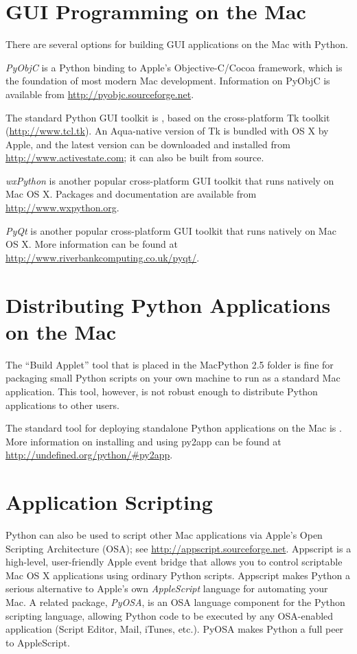 \section{GUI Programming on the Mac}

There are several options for building GUI applications on the Mac with Python.

\emph{PyObjC} is a Python binding to Apple's Objective-C/Cocoa framework, which
is the foundation of most modern Mac development. Information on PyObjC is
available from \url{http://pyobjc.sourceforge.net}.

The standard Python GUI toolkit is , based on the cross-platform
Tk toolkit (\url{http://www.tcl.tk}). An Aqua-native version of Tk is bundled
with OS X by Apple, and the latest version can be downloaded and installed from
\url{http://www.activestate.com}; it can also be built from source.

\emph{wxPython} is another popular cross-platform GUI toolkit that runs natively
on Mac OS X. Packages and documentation are available from
\url{http://www.wxpython.org}.

\emph{PyQt} is another popular cross-platform GUI toolkit that runs natively on
Mac OS X. More information can be found at
\url{http://www.riverbankcomputing.co.uk/pyqt/}.


\section{Distributing Python Applications on the Mac}

The ``Build Applet'' tool that is placed in the MacPython 2.5 folder is fine for
packaging small Python scripts on your own machine to run as a standard Mac
application. This tool, however, is not robust enough to distribute Python
applications to other users.

The standard tool for deploying standalone Python applications on the Mac is
. More information on installing and using py2app can be found
at \url{http://undefined.org/python/\#py2app}.

\section{Application Scripting}

Python can also be used to script other Mac applications via Apple's Open
Scripting Architecture (OSA); see
\url{http://appscript.sourceforge.net}. Appscript is a high-level, user-friendly
Apple event bridge that allows you to control scriptable Mac OS X applications
using ordinary Python scripts. Appscript makes Python a serious alternative to
Apple's own \emph{AppleScript} language for automating your Mac. A related
package, \emph{PyOSA}, is an OSA language component for the Python scripting
language, allowing Python code to be executed by any OSA-enabled application
(Script Editor, Mail, iTunes, etc.). PyOSA makes Python a full peer to
AppleScript.

